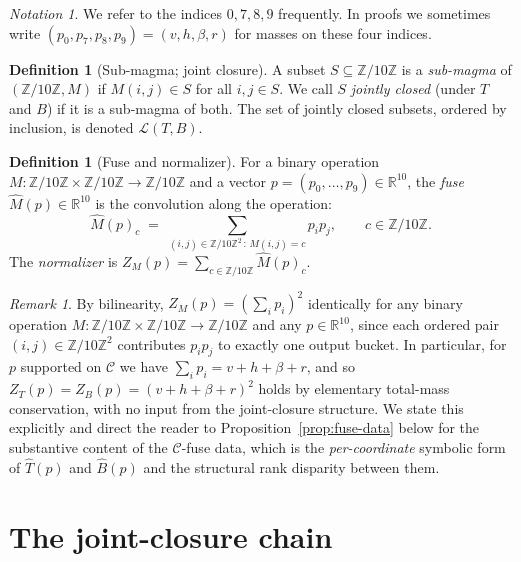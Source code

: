 \documentclass[11pt,reqno]{amsart}
\theoremstyle{plain}
\theoremstyle{definition}
\newtheorem{definition}[theorem]{Definition}
\theoremstyle{remark}
\newtheorem*{remark}{Remark}
\newtheorem*{notation}{Notation}
\newcommand{\Z}{\mathbb{Z}}
\newcommand{\R}{\mathbb{R}}
\newcommand{\Zten}{\Z/10\Z}
\newcommand{\Cfour}{\mathcal{C}}
\newcommand{\Tfuse}{\widehat{T}}
\newcommand{\Bfuse}{\widehat{B}}
\begin{document}
\begin{notation}
We refer to the indices $0,7,8,9$ frequently. In proofs we
sometimes write $(p_{0},p_{7},p_{8},p_{9})=(v,h,\beta,r)$ for
masses on these four indices.
\end{notation}

\begin{definition}[Sub-magma; joint closure]\label{def:submagma}
A subset $S\subseteq\Zten$ is a \emph{sub-magma} of $(\Zten,M)$ if
$M(i,j)\in S$ for all $i,j\in S$. We call $S$ \emph{jointly
closed} (under $T$ and $B$) if it is a sub-magma of both. The set
of jointly closed subsets, ordered by inclusion, is denoted
$\mathcal{L}(T,B)$.
\end{definition}

\begin{definition}[Fuse and normalizer]\label{def:fuse}
For a binary operation $M:\Zten\times\Zten\to\Zten$ and a vector
$p=(p_{0},\dots,p_{9})\in\R^{10}$, the \emph{fuse}
$\widehat{M}(p)\in\R^{10}$ is the convolution along the operation:
\[
\widehat{M}(p)_{c}\;=\;\sum_{(i,j)\in\Zten^{2}\,:\,M(i,j)=c}p_{i}p_{j},
\qquad c\in\Zten.
\]
The \emph{normalizer} is $Z_{M}(p)=\sum_{c\in\Zten}\widehat{M}(p)_{c}$.
\end{definition}

\begin{remark}\label{rem:total-mass}
By bilinearity, $Z_{M}(p) = (\sum_{i}p_{i})^{2}$ identically for
any binary operation $M:\Zten\times\Zten\to\Zten$ and any
$p\in\R^{10}$, since each ordered pair $(i,j)\in\Zten^{2}$
contributes $p_{i}p_{j}$ to exactly one output bucket. In
particular, for $p$ supported on $\Cfour$ we have
$\sum_{i}p_{i} = v+h+\beta+r$, and so
$Z_{T}(p) = Z_{B}(p) = (v+h+\beta+r)^{2}$ holds by elementary
total-mass conservation, with no input from the joint-closure
structure. We state this explicitly and direct the reader to
Proposition~\ref{prop:fuse-data} below for the substantive
content of the $\Cfour$-fuse data, which is the
\emph{per-coordinate} symbolic form of $\Tfuse(p)$ and
$\Bfuse(p)$ and the structural rank disparity between them.
\end{remark}

\section{The joint-closure chain}\label{sec:chain}
\end{document}

